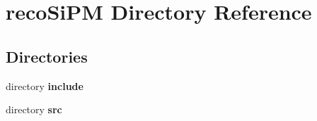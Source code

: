 \section{reco\-Si\-P\-M Directory Reference}
\label{dir_de2df6b45ef3ba744fcb5e9f065b7670}
\subsection*{Directories}
\begin{DoxyCompactItemize}
\item 
directory {\bf include}
\item 
directory {\bf src}
\end{DoxyCompactItemize}
